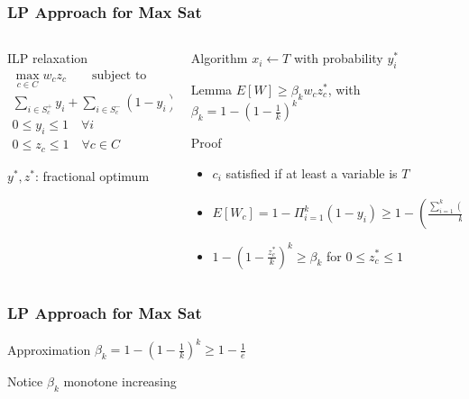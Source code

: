 \documentclass[12pt,aspectratio=169]{beamer}
\begin{document}
\begin{frame}\frametitle{LP Approach for Max Sat}
\begin{columns} 
  \begin{column}{0.48\textwidth}
\begin{block}{ILP relaxation}
  \begin{equation}
    \begin{split}
      \max_{c\in C}w_{c}z_{c}\qquad\text{subject to}\\
      \sum_{i\in S_{c}^{+}}y_{i} + \sum_{i\in S_{c}^{-}}(1 - y_{i})\ge z_{c}\quad \forall c\in C\\
      0 \le y_{i}\le 1\quad \forall i\\
      0\le z_{c}\le 1\quad \forall c\in C
     \end{split}
   \end{equation}
 \end{block}
 $y^{*}, z^{*}$: fractional optimum
\end{column}
  \begin{column}{0.48\textwidth}
    \begin{block}{Algorithm}
      $x_{i}\gets T$ with probability $y_{i}^{*}$
    \end{block}
    \begin{block}{Lemma}
      $E[W] \ge \beta_{k} w_{c}z_{c}^{*}$, with $\beta_{k}=1- \left(1- \frac{1}{k}\right)^{k}$
    \end{block}
    \begin{block}{Proof}
      \begin{itemize}
      \item
   $c_{i}$ satisfied if at least a variable is $T$
      \item
        $E[W_{c}] = 1- \Pi_{i=1}^{k}(1-y_{i}) \ge 1 - \left(\frac{\sum_{i=1}^{k}(1 -
            y_{i})}{k}\right)^{k} \ge 1 - \left(1 - \frac{z_{c}^{*}}{k}\right)^{k}$
      \item
        $1 - \left(1 - \frac{z_{c}^{*}}{k}\right)^{k} \ge \beta_{k}$ for $0\le
        z_{c}^{*}\le 1$
      \end{itemize}
    \end{block}
  \end{column}
\end{columns}
\end{frame}


\begin{frame}\frametitle{LP Approach for Max Sat}
\begin{block}{Approximation}
  $\beta_{k}=1- \left(1- \frac{1}{k}\right)^{k} \ge 1 - \frac{1}{e}$
\end{block}

\begin{block}{Notice}
  $\beta_{k}$ monotone increasing
\end{block}
\end{frame}
\end{document}
